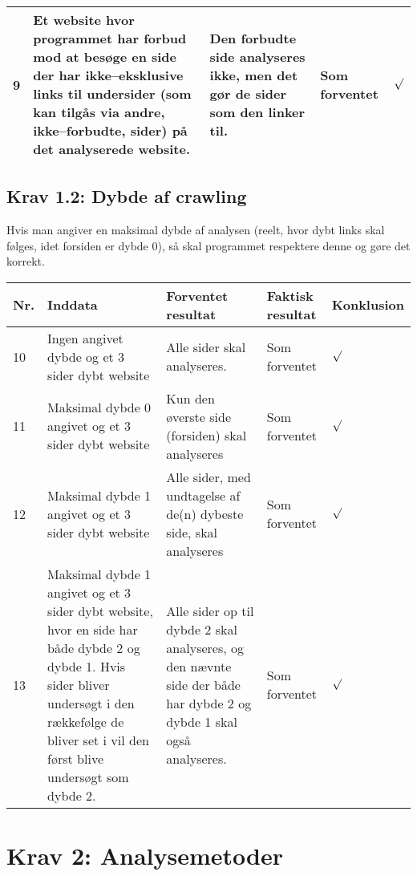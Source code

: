 \documentclass[a4paper,oneside,article]{memoir}
\begin{document}
\begin{landscape}
\begin{longtable}[c]{p{20pt}|p{220pt}|p{130pt}|p{130pt}|p{50pt}}
9 &
Et website hvor programmet har forbud mod at besøge en side der har
ikke--eksklusive links til undersider (som kan tilgås via andre,
ikke--forbudte, sider) på det analyserede website. &
Den forbudte side analyseres ikke, men det gør de sider som den linker
til. &
Som forventet &
$\surd$ \\ \hline

\end{longtable}

\subsection{Krav 1.2: Dybde af crawling}
Hvis man angiver en maksimal dybde af analysen (reelt, hvor dybt links
skal følges, idet forsiden er dybde 0), så skal programmet respektere
denne og gøre det korrekt.

\begin{longtable}[c]{p{20pt}|p{220pt}|p{130pt}|p{130pt}|p{50pt}}
\textbf{Nr.} &
\textbf{Inddata} &
\textbf{Forventet resultat} &
\textbf{Faktisk resultat} &
\textbf{Konklusion} \\ \hline

10 &
Ingen angivet dybde og et 3 sider dybt website &
Alle sider skal analyseres. &
Som forventet &
$\surd$ \\ \hline

11 &
Maksimal dybde 0 angivet og et 3 sider dybt website &
Kun den øverste side (forsiden) skal analyseres &
Som forventet &
$\surd$ \\ \hline

12 &
Maksimal dybde 1 angivet og et 3 sider dybt website &
Alle sider, med undtagelse af de(n) dybeste side, skal analyseres &
Som forventet &
$\surd$ \\ \hline

13 &
Maksimal dybde 1 angivet og et 3 sider dybt website, hvor en side har
både dybde 2 og dybde 1. Hvis sider bliver undersøgt i den rækkefølge de
bliver set i vil den først blive undersøgt som dybde 2. &
Alle sider op til dybde 2 skal analyseres, og den nævnte side der både
har dybde 2 og dybde 1 skal også analyseres. &
Som forventet &
$\surd$ \\ \hline

\end{longtable}

\section{Krav 2: Analysemetoder}


\end{landscape}
\end{document}
